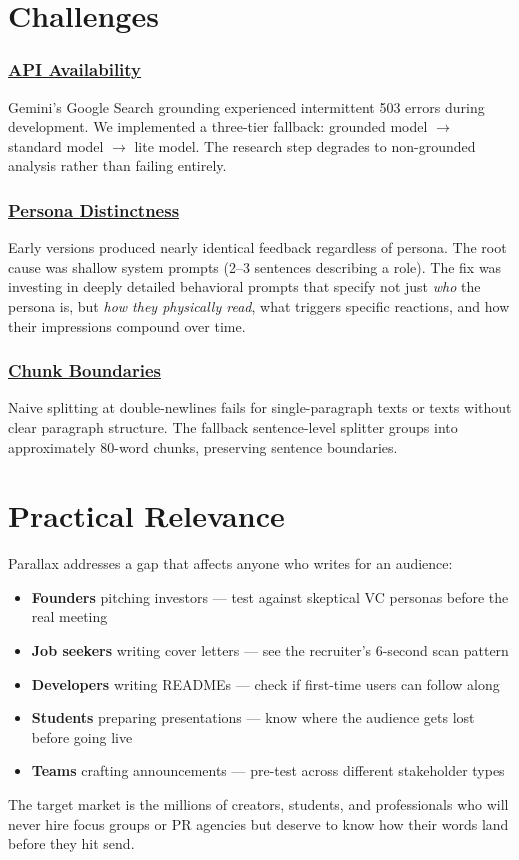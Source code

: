 \documentclass[a4paper, 11pt, twocolumn]{article}
\newcommand{\heady}[1]{\subsubsection*{\underline{#1}}}
\begin{document}
\section{Challenges}

\heady{API Availability}
Gemini's Google Search grounding experienced intermittent 503 errors during development. We implemented a three-tier fallback: grounded model $\to$ standard model $\to$ lite model. The research step degrades to non-grounded analysis rather than failing entirely.

\heady{Persona Distinctness}
Early versions produced nearly identical feedback regardless of persona. The root cause was shallow system prompts (2--3 sentences describing a role). The fix was investing in deeply detailed behavioral prompts that specify not just \textit{who} the persona is, but \textit{how they physically read}, what triggers specific reactions, and how their impressions compound over time.

\heady{Chunk Boundaries}
Naive splitting at double-newlines fails for single-paragraph texts or texts without clear paragraph structure. The fallback sentence-level splitter groups into approximately 80-word chunks, preserving sentence boundaries.

\section{Practical Relevance}

Parallax addresses a gap that affects anyone who writes for an audience:

\begin{itemize}[nosep, leftmargin=1.2em]
    \item \textbf{Founders} pitching investors --- test against skeptical VC personas before the real meeting
    \item \textbf{Job seekers} writing cover letters --- see the recruiter's 6-second scan pattern
    \item \textbf{Developers} writing READMEs --- check if first-time users can follow along
    \item \textbf{Students} preparing presentations --- know where the audience gets lost before going live
    \item \textbf{Teams} crafting announcements --- pre-test across different stakeholder types
\end{itemize}

The target market is the millions of creators, students, and professionals who will never hire focus groups or PR agencies but deserve to know how their words land before they hit send.
\end{document}
